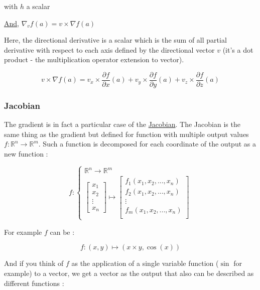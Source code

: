 \documentclass[12pt]{article}
\begin{document}
with $h$ a scalar

\href{ttps://en.wikipedia.org/wiki/Directional_derivative}{And}, $\nabla_{v}f(a) = v \times \nabla f(a)$

Here, the directional derivative is a scalar which is the sum of all partial derivative with respect to each axis defined by the directional vector $v$ (it's a dot product - the multiplication operator extension to vector).

$$
v \times \nabla f(a) = v_x \times \frac{\partial{f}}{\partial{x}}(a) + v_y \times \frac{\partial{f}}{\partial{y}}(a) + v_z \times \frac{\partial{f}}{\partial{z}}(a) 
$$

\subsubsection{Jacobian}

The gradient is in fact a particular case of the \href{https://en.wikipedia.org/wiki/Jacobian_matrix_and_determinant}{Jacobian}. The Jacobian is the same thing as the gradient but defined for function with multiple output values $f : \mathbb{R}^n \rightarrow \mathbb{R}^m$. Such a function is decomposed for each coordinate of the output as a new function :

$$
f : 
\begin{cases}
\mathbb{R}^n \rightarrow \mathbb{R}^m \\
\begin{bmatrix}
    x_1 \\
    x_2 \\
    \vdots \\
    x_n
\end{bmatrix} \mapsto

\begin{bmatrix}
    f_1(x_1, x_2, ..., x_n) \\
    f_2(x_1, x_2, ..., x_n) \\
    \vdots \\
    f_m(x_1, x_2, ..., x_n) \\
\end{bmatrix}

\end{cases}
$$

For example $f$ can be :

$$
f : (x,y) \mapsto (x \times y, \cos(x))
$$

And if you think of $f$ as the application of a single variable function ($\sin$ for example) to a vector, we get a vector as the output that also can be described as different functions :
\end{document}
